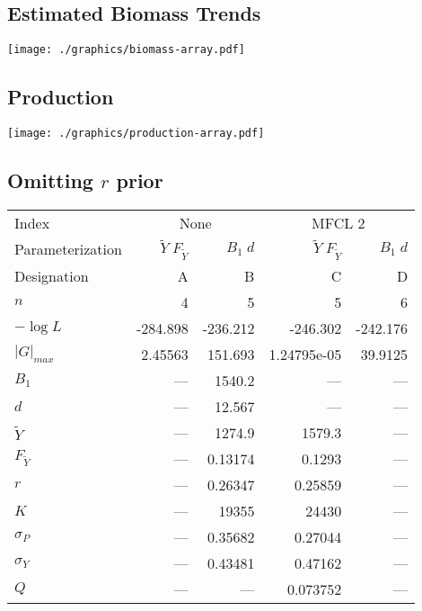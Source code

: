 \documentclass[letterpaper,KOMA,landscape,titlepage]{powersem}
\newcommand\MSY{\widetilde{Y}}
\newcommand\Fmsy{F_{\MSY}}
\newcommand\MSYFmsy{\MSY\;\Fmsy}
\newcommand\Bd{B_1\; d}
\begin{document}
\begin{slide}\section{Estimated Biomass Trends}
\label{fig:estbiomass}
\begin{center}
\texttt{[image: ./graphics/biomass-array.pdf]}
\end{center}
\end{slide}

\begin{slide}\section{Production}
\label{fig:estprod}
\begin{center}
\texttt{[image: ./graphics/production-array.pdf]}
\end{center}
\end{slide}

\begin{slide}\section{Omitting $r$ prior}
\label{tag:ests4NOprior}
{\scriptsize
\begin{center}
\begin{tabular}{|l|rr|rr|}
\hline
Index & \multicolumn{2}{c|}{None}&\multicolumn{2}{c|}{MFCL 2}\\
\cline{2-3}\cline{4-5}
Parameterization&$\MSYFmsy$&$\Bd$&$\MSYFmsy$&$\Bd$\\
Designation& A & B& C& D\\
\hline

\hline
$n$ & 4 & 5 & 5 & 6\\
$-\log L$ & -284.898 & -236.212 & -246.302 & -242.176\\
$|G|_{max}$ & 2.45563 & 151.693 & 1.24795e-05 & 39.9125\\
\hline
$B_1$ & --- & 1540.2 & --- & ---\\
$d$ & --- & 12.567 & --- & ---\\
$\MSY$ & --- & 1274.9 & 1579.3 & ---\\
$\Fmsy$ & --- & 0.13174 & 0.1293 & ---\\
$r$ & --- & 0.26347 & 0.25859 & ---\\
$K$ & --- & 19355 & 24430 & ---\\
$\sigma_P$ & --- & 0.35682 & 0.27044 & ---\\
$\sigma_Y$ & --- & 0.43481 & 0.47162 & ---\\
$Q$ & --- & --- & 0.073752 & ---\\
\hline
\end{tabular}
\end{center} }
\end{slide}
\end{document}

